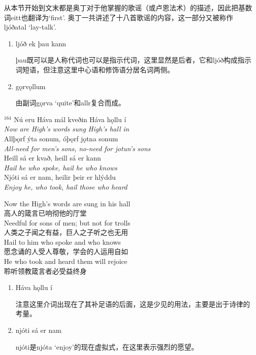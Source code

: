 \begin{grammar*}{}
    从本节开始到文末都是奥丁对于他掌握的歌谣（或卢恩法术）的描述，因此把基数词eitt也翻译为`first'. 奥丁一共讲述了十八首歌谣的内容，这一部分又被称作ljóðatal `lay-talk'.
    \begin{enumerate}[leftmargin=*]
        \item ljóð ek þau kann

              þau既可以是人称代词也可以是指示代词，这里显然是后者，它和ljóð构成指示词短语，但注意这里中心语和修饰语分居名词两侧。

        \item gǫrvǫllum

              由副词gǫrva `quite'和allr复合而成。
    \end{enumerate}
\end{grammar*}
\medskip %
\begin{paracol}{2}
    \noindent
    $^{164}$ Nú eru Háva mál kveðin Háva hǫllu í\\
    \textit{Now are High's words sung High's hall in}\\
    Allþǫrf ýta sonum, óþǫrf jǫtna sonum\\
    \textit{All-need for men's sons, no-need for jotun's sons}\\
    Heill sá er kvað, heill sá er kann\\
    \textit{Hail he who spoke, hail he who knows}\\
    Njóti sá er nam, heilir þeir er hlýddu\\
    \textit{Enjoy he, who took, hail those who heard }\\
    \switchcolumn

    \noindent
    Now the High's words are sung in his hall\\
    高人的箴言已响彻他的厅堂\\
    Needful for sons of men; but not for trolls\\
    人类之子闻之有益，巨人之子听之也无用\\
    Hail to him who spoke and who knows\\
    愿念诵的人受人尊敬，学会的人运用自如\\
    He who took and heard them will rejoice\\
    聆听领教箴言者必受益终身\\

\end{paracol}

\begin{grammar*}{}
    \begin{enumerate}[leftmargin=*]
        \item Háva hǫllu í

              注意这里介词出现在了其补足语的后面，这是少见的用法，主要是出于诗律的考量。

        \item njóti sá er nam

              njóti是njóta `enjoy'的现在虚拟式，在这里表示强烈的愿望。

    \end{enumerate}
\end{grammar*}
\medskip %
